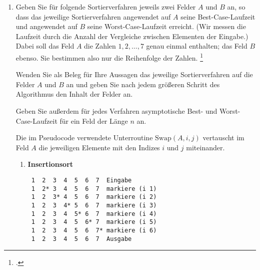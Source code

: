 \documentclass{lehramt-informatik-aufgabe}
\begin{document}

\begin{enumerate}


\item Geben Sie für folgende Sortierverfahren jeweils zwei Felder $A$
und $B$ an, so dass das jeweilige Sortierverfahren angewendet auf $A$
seine Best-Case-Laufzeit und angewendet auf $B$ seine
Worst-Case-Laufzeit erreicht. (Wir messen die Laufzeit durch die Anzahl
der Vergleiche zwischen Elementen der Eingabe.) Dabei soll das Feld $A$
die Zahlen $1,2,\dots,7$ genau einmal enthalten; das Feld $B$ ebenso.
Sie bestimmen also nur die Reihenfolge der Zahlen.
\footcite{examen:66115:2021:03}

Wenden Sie als Beleg für Ihre Aussagen das jeweilige Sortierverfahren
auf die Felder $A$ und $B$ an und geben Sie nach jedem größeren Schritt
des Algorithmus den Inhalt der Felder an.

Geben Sie außerdem für jedes Verfahren asymptotische Best- und
Worst-Case-Laufzeit für ein Feld der Länge $n$ an.

Die im Pseudocode verwendete Unterroutine $\text{Swap} (A,i,j)$
vertauscht im Feld $A$ die jeweiligen Elemente mit den Indizes $i$ und
$j$ miteinander.
\begin{enumerate}


\item \textbf{Insertionsort}

\begin{liAntwort}


\begin{verbatim}
 1  2  3  4  5  6  7  Eingabe
 1  2* 3  4  5  6  7  markiere (i 1)
 1  2  3* 4  5  6  7  markiere (i 2)
 1  2  3  4* 5  6  7  markiere (i 3)
 1  2  3  4  5* 6  7  markiere (i 4)
 1  2  3  4  5  6* 7  markiere (i 5)
 1  2  3  4  5  6  7* markiere (i 6)
 1  2  3  4  5  6  7  Ausgabe
\end{verbatim}


\end{liAntwort}
\end{enumerate}
\end{enumerate}
\end{document}
